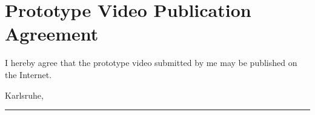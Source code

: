 %
%
\chapter{Prototype Video Publication Agreement}
\label{ch:Agreement}

I hereby agree that the prototype video submitted by me may be published on the Internet.

\vspace*{1cm}
\begin{flushright}
Karlsruhe, \submissiontime \hspace*{0.5cm} \rule{0.4\textwidth}{0.5pt} \\
\myname \hspace*{1.3cm}
\end{flushright}
